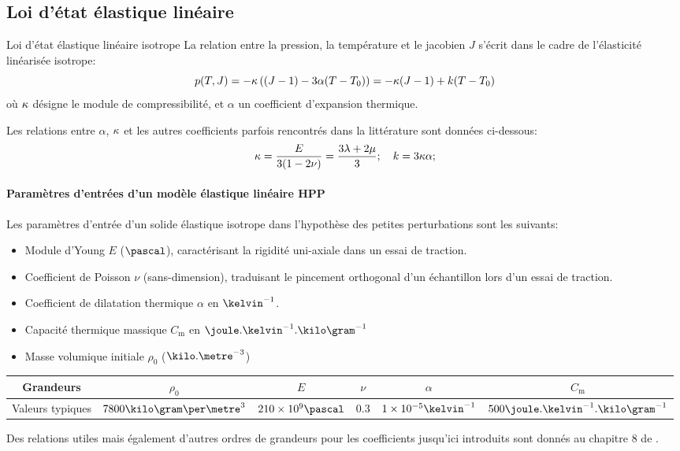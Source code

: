 \documentclass[10pt]{book}
\newcommand{\Cm}{C_{\mathrm{m}}}
\begin{document}
\subsection{Loi d'état élastique linéaire}
\begin{Propo}{Loi d'état élastique linéaire isotrope} La relation entre la pression, la température et le jacobien $J$ s'écrit dans le cadre de l'élasticité linéarisée isotrope:
\begin{equation}
p(T,J) = -\kappa\left((J-1)-3\alpha(T-T_{0})\right)= -\kappa (J-1)+k(T-T_{0})
\label{eq:eos_HPP}
\end{equation}
où $\kappa$ désigne le module de compressibilité, et $\alpha$ un coefficient d’expansion thermique.
\end{Propo}
Les relations entre $\alpha$, $\kappa$ et les autres coefficients parfois rencontrés dans la littérature sont données ci-dessous:
$$\kappa=\dfrac{E}{3(1-2\nu)}=\dfrac{3\lambda+2\mu}{3} ; \quad k = 3\kappa\alpha;$$
\paragraph{Paramètres d'entrées d'un modèle élastique linéaire HPP}
Les paramètres d'entrée d'un solide élastique isotrope dans l'hypothèse des petites perturbations sont les suivants:
\begin{itemize}
\item Module d'Young $E$ ($\pascal$), caractérisant la rigidité uni-axiale dans un essai de traction.
\item Coefficient de Poisson $\nu$ (sans-dimension), traduisant le pincement orthogonal d'un échantillon lors d'un essai de traction.
\item Coefficient de dilatation thermique $\alpha$ en $\kelvin^{-1}$.
\item Capacité thermique massique $\Cm$ en $\joule.\kelvin^{-1}.\kilo\gram^{-1}$
\item Masse volumique initiale $\rho_{0}$ ($\kilo.\metre^{-3}$)
\end{itemize}
\begin{table}[h!]
\centering \begin{tabular}{|c|c|c|c|c|c|}\hline
Grandeurs & $\rho_{0}$ & $E$ & $\nu$ & $\alpha$ & $\Cm$\\\hline
Valeurs typiques & $7800\kilo\gram\per\metre^{3}$ & $210\times10^{9}\pascal$ & $0.3$ & $1\times 10^{-5}\kelvin^{-1}$ & $500\joule.\kelvin^{-1}.\kilo\gram^{-1}$\\\hline
\end{tabular}
\end{table}
Des relations utiles mais également d'autres ordres de grandeurs pour les coefficients jusqu'ici introduits sont donnés au chapitre 8 de \cite{forest2015mecanique}.
\end{document}
